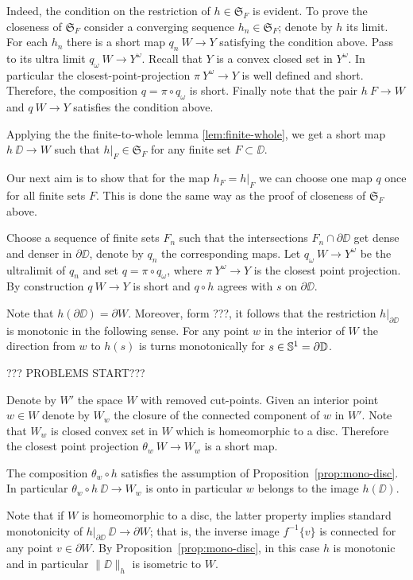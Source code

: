 \documentclass{article}
\begin{document}
Indeed, the condition on the restriction of $h\in  \mathfrak{S}_F$ is evident.
To prove the closeness of $\mathfrak{S}_F$ consider a converging sequence $h_n\in  \mathfrak{S}_F$;
denote by $h$ its limit.
For each $h_n$ there is a short map $q_n\:W\to Y$ satisfying the condition above.
Pass to its ultra limit $q_\omega\:W\to Y^\omega$.
Recall that $Y$ is a convex closed set in $Y^\omega$.
In particular the closest-point-projection $\pi\:Y^\omega\to Y$ is well defined and short.
Therefore, the composition $q=\pi\circ q_\omega$ is short.
Finally note that the pair $h\:F\to W$ and $q\:W\to Y$ satisfies the condition above.

Applying the the finite-to-whole lemma \ref{lem:finite-whole},
we get a short map $h\:\DD\to W$ such that $h|_F\in \mathfrak{S}_F$
for any finite set $F\subset \DD$.

Our next aim is to show that for the map $h_F=h|_F$ we can choose one map $q$ once for all finite sets $F$.
This is done the same way as the proof of closeness of $\mathfrak{S}_F$ above.

Choose a sequence of finite sets $F_n$ such that the intersections $F_n\cap\partial \DD$ get dense and denser in $\partial \DD$, denote by $q_n$ the corresponding maps.
Let $q_\omega\:W\to Y^\omega$ be the ultralimit of $q_n$ and set $q=\pi\circ q_\omega$,
where $\pi\:Y^\omega\to Y$ is the closest point projection.
By construction $q\:W\to Y$ is short and $q\circ h$ agrees with $s$ on $\partial \DD$.

Note that $h(\partial\DD)= \partial W$.
Moreover, form ???, it follows that the restriction $h|_{\partial\DD}$ is monotonic in the following sense.
For any point $w$ in the interior of $W$ the direction from $w$ to $h(s)$ is turns monotonically for $s\in \mathbb{S}^1=\partial\mathbb{D}$.

??? PROBLEMS START???

Denote by $W'$ the space $W$ with removed cut-points.
Given an interior point $w\in W$ denote by $W_w$ the closure of the connected component of $w$ in $W'$.
Note that $W_w$ is closed convex set in $W$ which is homeomorphic to a disc.
Therefore the closest point projection $\theta_w\:W\to W_w$ is a short map.

The composition $\theta_w\circ h$ satisfies the assumption of  Proposition~\ref{prop:mono-disc}.
In particular $\theta_w\circ h\:\DD\to W_w$ is onto in particular $w$ belongs to the image $h(\DD)$.


Note that if $W$ is homeomorphic to a disc, the latter property implies standard monotonicity of $h|_{\partial\DD}\:\DD\to\partial W$;
that is, the inverse image $f^{-1}\{v\}$ is connected for any point $v\in\partial W$.
By Proposition~\ref{prop:mono-disc}, in this case $h$ is monotonic and in particular $\|\DD\|_h$ is isometric to $W$.
\qeds
\end{document}
